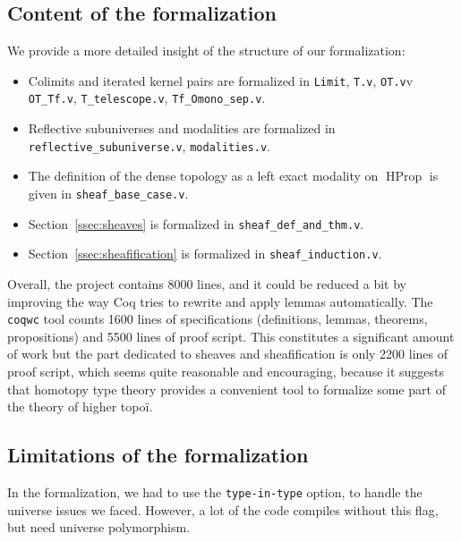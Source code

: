 \documentclass[notfinal]{jfrarticle}
\DeclareMathOperator{\HProp}{HProp}
\begin{document}
\subsection{Content of the formalization}
\label{ssec:cont-form}

We provide a more detailed insight of the structure of our formalization:
\begin{itemize} 
\item Colimits and iterated kernel pairs are formalized in
\texttt{Limit}, \texttt{T.v}, \texttt{OT.v}v \texttt{OT\_Tf.v}, \texttt{T\_telescope.v}, \texttt{Tf\_Omono\_sep.v}.%
\item
Reflective subuniverses and modalities are formalized in\\
\texttt{reflective\_subuniverse.v}, \texttt{modalities.v}. %
\item 
%
  The definition of the dense topology as a left exact modality on
  $\HProp$ is given in \texttt{sheaf\_base\_case.v}. %
\item
Section~\ref{ssec:sheaves} is formalized in
\texttt{sheaf\_def\_and\_thm.v}. %
\item
Section~\ref{ssec:sheafification} is formalized in
\texttt{sheaf\_induction.v}. %
\end{itemize}

Overall, %
the project
contains 8000 lines, and it could be reduced a bit by improving the
way Coq tries to rewrite and apply lemmas automatically. 
The \texttt{coqwc} tool counts 1600 lines of specifications
(definitions, lemmas, theorems, propositions) and 5500 lines of proof
script.
%
This constitutes a significant amount of work but the part dedicated
to sheaves and sheafification is only 2200 lines of proof script,
which seems quite reasonable and encouraging, because it suggests
that homotopy type theory provides a convenient tool to formalize some
part of the theory of higher topoï. 

\subsection{Limitations of the formalization}
\label{ssec:limit-form}

In the formalization, we had to use the \texttt{type-in-type} option, to handle
the universe issues we faced. However, a lot of the code compiles
without this flag, but need universe polymorphism. 
\end{document}
